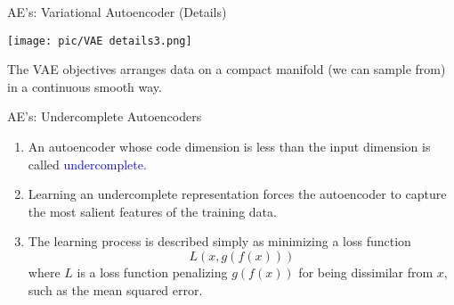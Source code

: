 \documentclass[serif, aspectratio=169]{beamer}
\begin{document}
\begin{frame}{AE's: Variational Autoencoder (Details)}
    \begin{center}
        \texttt{[image: pic/VAE details3.png]}
    \end{center}
    The VAE objectives arranges data on a compact manifold (we can sample from) in a continuous smooth way.

\end{frame}

\begin{frame}{AE’s: Undercomplete Autoencoders}
    \begin{enumerate}
        \item An autoencoder whose code dimension is less than the input dimension is called \textcolor{blue}{undercomplete}.
        \vspace{0.3cm}
        
        \item Learning an undercomplete representation forces the autoencoder to capture the most salient features of the training data.
        \vspace{0.3cm}
        
        \item The learning process is described simply as minimizing a loss function
        \begin{equation*}
            L(x, g(f(x)))
        \end{equation*}
        where \( L \) is a loss function penalizing \( g(f(x)) \) for being dissimilar from \( x \), such as the mean squared error.
    \end{enumerate}
\end{frame}
\end{document}
